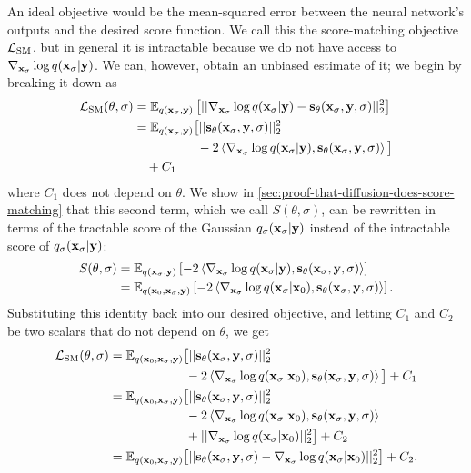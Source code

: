 An ideal objective would be the mean-squared error between the neural network's outputs and the desired score function. We call this the score-matching objective ${\mathcal{L}}_\text{SM}$, but in general it is intractable because we do not have access to $\nabla_{{\mathbf{x}}_\sigma} \log q({\mathbf{x}}_\sigma|{\mathbf{y}})$. We can, however, obtain an unbiased estimate of it; we begin by breaking it down as
\begin{align}
    \mathcal{L}_\text{SM}(\theta, \sigma) &= \mathbb{E}_{q({\mathbf{x}}_\sigma, {\mathbf{y}})} \left[ || \nabla_{{\mathbf{x}}_\sigma} \log q({\mathbf{x}}_\sigma|{\mathbf{y}}) - {\mathbf{s}}_\theta({\mathbf{x}}_\sigma, {\mathbf{y}}, \sigma) ||_2^2 \right] \\
    &= \mathbb{E}_{q({\mathbf{x}}_\sigma, {\mathbf{y}})} \big[ 
    || {\mathbf{s}}_\theta({\mathbf{x}}_\sigma, {\mathbf{y}}, \sigma) ||_2^2
    \nonumber\\ &\qquad\qquad\quad
    - 2 \left\langle \nabla_{{\mathbf{x}}_\sigma} \log q({\mathbf{x}}_\sigma|{\mathbf{y}}),
    {\mathbf{s}}_\theta({\mathbf{x}}_\sigma, {\mathbf{y}}, \sigma) \right\rangle \big]
    \nonumber\\ &\quad
    + C_1
\end{align}
where $C_1$ does not depend on $\theta$. We show in \cref{sec:proof-that-diffusion-does-score-matching} that this second term, which we call $S(\theta, \sigma)$, can be rewritten in terms of the tractable score of the Gaussian $q_{\sigma}({\mathbf{x}}_\sigma|{\mathbf{y}})$ instead of the intractable score of $q_{\sigma}({\mathbf{x}}_\sigma|{\mathbf{y}})$:
\begin{align}
\allowdisplaybreaks
S(\theta, \sigma) &= \EX_{q(\rvx_\sigma, \rvy)} \left[ - 2 \left\langle \nabla_{\rvx_\sigma} \log q(\rvx_\sigma|\rvy), \rvs_\theta(\rvx_\sigma, \rvy, \sigma) \right\rangle \right] \\
    &= \EX_{q(\rvx_0, \rvx_\sigma, \rvy)} \left[ -2 \left\langle \nabla_{\rvx_\sigma} \log q(\rvx_\sigma|\rvx_0), \rvs_\theta(\rvx_\sigma, \rvy, \sigma) \right\rangle  \right].
\end{align}
Substituting this identity back into our desired objective, and letting $C_1$ and $C_2$ be two scalars that do not depend on $\theta$, we get
\begin{align}
    \mathcal{L}_\text{SM}(\theta, \sigma) &= \mathbb{E}_{q({\mathbf{x}}_0, {\mathbf{x}}_\sigma, {\mathbf{y}})} \big[ 
    || {\mathbf{s}}_\theta({\mathbf{x}}_\sigma, {\mathbf{y}}, \sigma) ||_2^2
    \nonumber\\ &\qquad\qquad\qquad
    - 2 \left\langle \nabla_{{\mathbf{x}}_\sigma} \log q({\mathbf{x}}_\sigma|{\mathbf{x}}_0), {\mathbf{s}}_\theta({\mathbf{x}}_\sigma, {\mathbf{y}}, \sigma) \right\rangle \big] + C_1 \\
    &= \mathbb{E}_{q({\mathbf{x}}_0, {\mathbf{x}}_\sigma, {\mathbf{y}})} \big[ 
    || {\mathbf{s}}_\theta({\mathbf{x}}_\sigma, {\mathbf{y}}, \sigma) ||_2^2
    \nonumber\\ &\qquad\qquad\qquad
    - 2 \left\langle \nabla_{{\mathbf{x}}_\sigma} \log q({\mathbf{x}}_\sigma|{\mathbf{x}}_0), {\mathbf{s}}_\theta({\mathbf{x}}_\sigma, {\mathbf{y}}, \sigma) \right\rangle
    \nonumber\\ &\qquad\qquad\qquad
    + || \nabla_{{\mathbf{x}}_\sigma} \log q({\mathbf{x}}_\sigma|{\mathbf{x}}_0) ||_2^2 \big] + C_2 \\
    &= \mathbb{E}_{q({\mathbf{x}}_0, {\mathbf{x}}_\sigma, {\mathbf{y}})} \big[ 
    || {\mathbf{s}}_\theta({\mathbf{x}}_\sigma, {\mathbf{y}}, \sigma) - \nabla_{{\mathbf{x}}_\sigma} \log q({\mathbf{x}}_\sigma|{\mathbf{x}}_0) ||_2^2 \big] + C_2.
\end{align}
